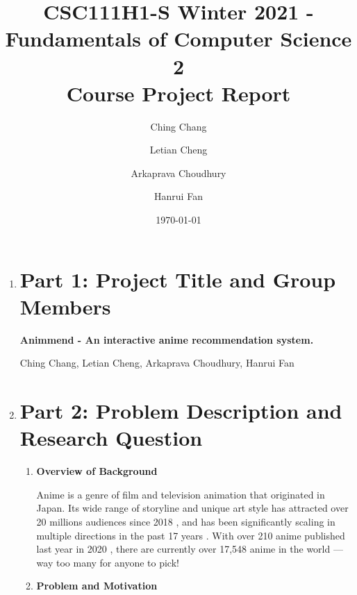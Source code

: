\documentclass[12pt]{article}
\title{CSC111H1-S Winter 2021 - Fundamentals of Computer Science 2 \\ Course Project Report}
\author{
  Ching Chang\\
  \and
  Letian Cheng\\
  \and
  Arkaprava Choudhury\\
  \and
  Hanrui Fan
}
\date{\today}
\begin{document}
\maketitle

\newpage


\begin{enumerate}
\item \section*{Part 1: Project Title and Group Members}
\textbf{Animmend - An interactive anime recommendation system.}

Ching Chang, Letian Cheng, Arkaprava Choudhury, Hanrui Fan

\newpage

\item \section*{Part 2: Problem Description and Research Question}
\begin{enumerate}
    \item \textbf{Overview of Background}
    
    \quad Anime is a genre of film and television animation that originated in Japan. Its wide range of storyline and unique art style has attracted over 20 millions audiences since 2018 \citep{Ani18}, and has been significantly scaling in multiple directions in the past 17 years \citep{Ell18}. With over 210 anime published last year in 2020 \citep{wiki21}, there are currently over 17,548 anime in the world \citep{MyA21} — way too many for anyone to pick!
    
    \item \textbf{Problem and Motivation}
    

\end{enumerate}
\end{enumerate}
\end{document}
